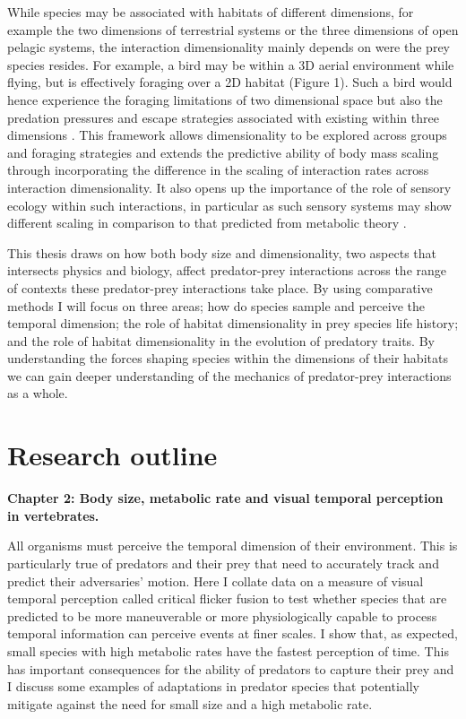 While species may be associated with habitats of different dimensions, for example the two dimensions of terrestrial systems or the three dimensions of open pelagic systems, the interaction dimensionality mainly depends on were the prey species resides. For example, a bird may be within a 3D aerial environment while flying, but is effectively foraging over a 2D habitat (Figure 1). Such a bird would hence experience the foraging limitations of two dimensional space but also the predation pressures and escape strategies associated with existing within three dimensions \citep{pawar2012dimensionality}. This framework allows dimensionality to be explored across groups and foraging strategies and extends the predictive ability of body mass scaling through incorporating the difference in the scaling of interaction rates across interaction dimensionality. 
It also opens up the importance of the role of sensory ecology within such interactions, in particular as such sensory systems may show different scaling in comparison to that predicted from metabolic theory \citep{mcgill2006allometric,kiltie2000scaling}. 


This thesis draws on how both body size and dimensionality, two aspects that intersects physics and biology, affect predator-prey interactions across the range of contexts these predator-prey interactions take place. By using comparative methods I will focus on three areas; how do species sample and perceive the temporal dimension; the role of habitat dimensionality in prey species life history; and the role of habitat dimensionality in the evolution of predatory traits. By understanding the forces shaping species within the dimensions of their habitats we can gain deeper understanding of the mechanics of predator-prey interactions as a whole.\\


\section{\uppercase{R}esearch outline}


\textbf{Chapter 2: Body size, metabolic rate and visual temporal perception in vertebrates.}


 All organisms must perceive the temporal dimension of their environment. This is particularly true of predators and their prey that need to accurately track and predict their adversaries' motion. Here I collate data on a measure of visual temporal perception called critical flicker fusion to test whether species that are predicted to be more maneuverable or more physiologically capable to process temporal information can perceive events at finer scales. I show that, as expected, small species with high metabolic rates have the fastest perception of time. This has important consequences for the ability of predators to capture their prey and I discuss some examples of adaptations in predator species that potentially mitigate against the need for small size and a high metabolic rate.\\



